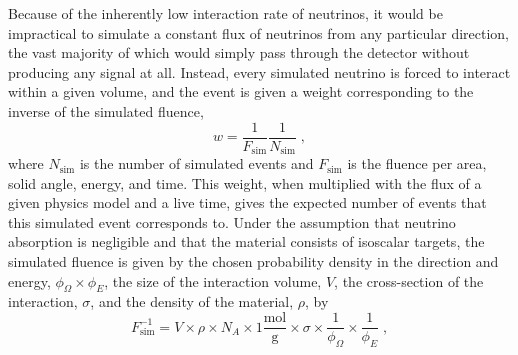Because of the inherently low interaction rate of neutrinos, it would be impractical to simulate a constant flux of neutrinos from any particular direction, the vast majority of which would simply pass through the detector without producing any signal at all. Instead, every simulated neutrino is forced to interact within a given volume, and the event is given a weight corresponding to the inverse of the simulated fluence,
\begin{equation}
    w = \frac{1}{F_{\mathrm{sim}}} \frac{1}{N_{\mathrm{sim}}}\;,
\end{equation}
where $N_{\mathrm{sim}}$ is the number of simulated events and $F_{\mathrm{sim}}$ is the fluence per area, solid angle, energy, and time. This weight, when multiplied with the flux of a given physics model and a live time, gives the expected number of events that this simulated event corresponds to.
Under the assumption that neutrino absorption is negligible and that the material consists of isoscalar targets, the simulated fluence is given by the chosen probability density in the direction and energy, $\phi_\Omega \times \phi_E$,  the size of the interaction volume, $V$, the cross-section of the interaction, $\sigma$, and the density of the material, $\rho$, by
\begin{equation}
    F_{\mathrm{sim}}^{-1} = V \times \rho \times N_A \times 1\frac{\mathrm{mol}}{\mathrm{g}} \times \sigma \times \frac{1}{\phi_\Omega} \times \frac{1}{\phi_E}\;,
\end{equation}
